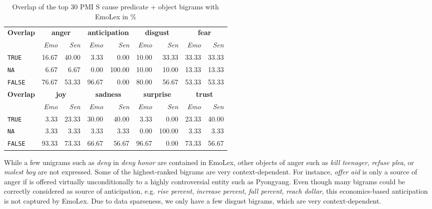 \begin{table}[]
\centering
\begin{tabular}{l|rr|rr|rr|rr}
{\bf Overlap} & \multicolumn{2}{c}{{\bf anger}} & \multicolumn{2}{c}{{\bf anticipation}} & \multicolumn{2}{c}{{\bf disgust}} & \multicolumn{2}{c}{{\bf fear}} \\
 & {\it Emo} & {\it Sen} & {\it Emo} & {\it Sen} & {\it Emo} & {\it Sen} & {\it Emo} & {\it Sen} \\\hline
\texttt{TRUE} & 16.67 & 40.00 & 3.33 & 0.00 & 10.00 & 33.33 & 33.33 & 33.33 \\
\texttt{NA} & 6.67 & 6.67 & 0.00 & 100.00 & 10.00 & 10.00 & 13.33 & 13.33 \\
\texttt{FALSE} & 76.67 & 53.33 & 96.67 & 0.00 & 80.00 & 56.67 & 53.33 & 53.33 \\\hline
{\bf Overlap} & \multicolumn{2}{c}{{\bf joy}} & \multicolumn{2}{c}{{\bf sadness}} & \multicolumn{2}{c}{{\bf surprise}} & \multicolumn{2}{c}{{\bf trust}} \\
 & {\it Emo} & {\it Sen} & {\it Emo} & {\it Sen} & {\it Emo} & {\it Sen} & {\it Emo} & {\it Sen} \\\hline
\texttt{TRUE} & 3.33 & 23.33 & 30.00 & 40.00 & 3.33 & 0.00 & 23.33 & 40.00 \\
\texttt{NA} & 3.33 & 3.33 & 3.33 & 3.33 & 0.00 & 100.00 & 3.33 & 3.33 \\
\texttt{FALSE} & 93.33 & 73.33 & 66.67 & 56.67 & 96.67 & 0.00 & 73.33 & 56.67
\end{tabular}
\caption{Overlap of the top 30 PMI S cause predicate + object bigrams with EmoLex in \%}
\label{tab:s-cause-pred-dobj-nrc-overlap}
\end{table}

While a few unigrams such as \textit{deny} in \textit{deny honor} are contained in EmoLex, other objects of anger such as \textit{kill teenager}, \textit{refuse plea}, or \textit{molest boy} are not expressed. Some of the highest-ranked bigrams are very context-dependent. For instance, \textit{offer aid} is only a source of anger if is offered virtually unconditionally to a highly controversial entity such as Pyongyang. Even though many bigrams could be correctly considered as source of anticipation, e.g. \textit{rise percent}, \textit{increase percent}, \textit{fall percent}, \textit{reach dollar}, this economics-based anticipation is not captured by EmoLex. Due to data sparseness, we only have a few disgust bigrams, which are very context-dependent.

